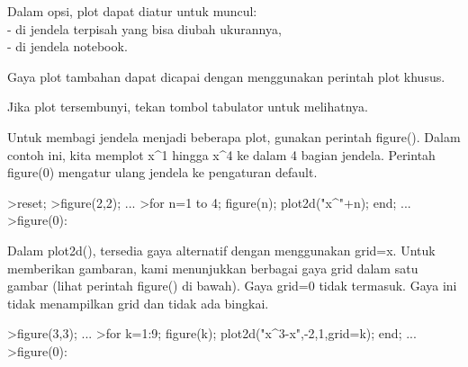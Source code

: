 \documentclass[a4paper,10pt]{article}
\begin{document}
\begin{eulernotebook}
\begin{eulercomment}
\begin{eulercomment}
\begin{eulercomment}
\begin{eulercomment}
\begin{eulercomment}
\begin{eulercomment}
\begin{eulercomment}
\begin{eulercomment}
\begin{eulercomment}
\begin{eulercomment}
\begin{eulercomment}
\begin{eulercomment}
\begin{eulercomment}
\begin{eulercomment}
\begin{eulercomment}
\begin{eulercomment}
\begin{eulercomment}
\begin{eulercomment}
\begin{eulercomment}
\begin{eulercomment}
\begin{eulercomment}
\begin{eulercomment}
\begin{eulercomment}
\begin{eulercomment}
\begin{eulercomment}
\begin{eulercomment}
\begin{eulercomment}
\begin{eulercomment}
\begin{eulercomment}
\begin{eulercomment}
\begin{eulercomment}
\begin{eulercomment}
\begin{eulercomment}
\begin{eulercomment}
\begin{eulercomment}
\begin{eulercomment}
\begin{eulercomment}
Dalam opsi, plot dapat diatur untuk muncul:\\
- di jendela terpisah yang bisa diubah ukurannya,\\
- di jendela notebook.

Gaya plot tambahan dapat dicapai dengan menggunakan perintah plot
khusus.

Jika plot tersembunyi, tekan tombol tabulator untuk melihatnya.

Untuk membagi jendela menjadi beberapa plot, gunakan perintah
figure(). Dalam contoh ini, kita memplot x\textasciicircum{}1 hingga x\textasciicircum{}4 ke dalam 4
bagian jendela. Perintah figure(0) mengatur ulang jendela ke
pengaturan default.
\end{eulercomment}
\begin{eulerprompt}
>reset; 
>figure(2,2); ...
>for n=1 to 4; figure(n); plot2d("x^"+n); end; ...
>figure(0):
\end{eulerprompt}
\begin{eulercomment}
Dalam plot2d(), tersedia gaya alternatif dengan menggunakan grid=x.
Untuk memberikan gambaran, kami menunjukkan berbagai gaya grid dalam
satu gambar (lihat perintah figure() di bawah). Gaya grid=0 tidak
termasuk. Gaya ini tidak menampilkan grid dan tidak ada bingkai.
\end{eulercomment}
\begin{eulerprompt}
>figure(3,3); ...
>for k=1:9; figure(k); plot2d("x^3-x",-2,1,grid=k); end; ...
>figure(0):
\end{eulerprompt}
\begin{eulercomment}

\end{eulercomment}
\end{eulercomment}
\end{eulercomment}
\end{eulercomment}
\end{eulercomment}
\end{eulercomment}
\end{eulercomment}
\end{eulercomment}
\end{eulercomment}
\end{eulercomment}
\end{eulercomment}
\end{eulercomment}
\end{eulercomment}
\end{eulercomment}
\end{eulercomment}
\end{eulercomment}
\end{eulercomment}
\end{eulercomment}
\end{eulercomment}
\end{eulercomment}
\end{eulercomment}
\end{eulercomment}
\end{eulercomment}
\end{eulercomment}
\end{eulercomment}
\end{eulercomment}
\end{eulercomment}
\end{eulercomment}
\end{eulercomment}
\end{eulercomment}
\end{eulercomment}
\end{eulercomment}
\end{eulercomment}
\end{eulercomment}
\end{eulercomment}
\end{eulercomment}
\end{eulercomment}
\end{eulernotebook}
\end{document}
